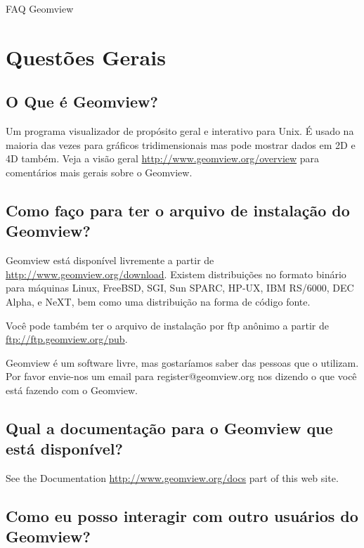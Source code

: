 \documentclass[12pt,a4paper]{article}
\begin{document}
\vspace*{6cm}
\huge
\begin{center}
FAQ
Geomview
\end{center}
\normalsize
\newpage
\tableofcontents
\newpage

\section{Quest\~oes Gerais}

    \subsection{O Que \'e Geomview?}

        Um programa visualizador de prop\'{o}sito geral e interativo para Unix. \'E usado
        na maioria das vezes para gr\'aficos tridimensionais mas pode mostrar dados em 2D e 4D tamb\'em. Veja
        a vis\~ao geral  \url{http://www.geomview.org/overview} para coment\'arios mais
        gerais sobre o Geomview.

    \subsection{Como fa\c{c}o para ter o arquivo de instala\c{c}\~ao do Geomview?}

        Geomview est\'a dispon\'ivel livremente a partir de  \url{http://www.geomview.org/download}.
        Existem distribui\c{c}\~oes no formato bin\'ario para m\'aquinas Linux, FreeBSD, SGI, Sun SPARC,
        HP-UX, IBM RS/6000, DEC Alpha, e NeXT, bem como uma distribui\c{c}\~ao na forma de
        c\'{o}digo fonte.

        Voc\^e pode tamb\'em ter o arquivo de instala\c{c}\~ao por ftp an\^onimo a partir de \url{ftp://ftp.geomview.org/pub}.

        Geomview \'e um software livre, mas gostar\'iamos saber das pessoas que o utilizam.
        Por favor envie-nos um email para register@geomview.org nos dizendo o que
        voc\^e est\'a fazendo com o Geomview.

    \subsection{Qual a documenta\c{c}\~ao para o Geomview que est\'a dispon\'ivel?}

        See the Documentation \url{http://www.geomview.org/docs} part of this web site.

    \subsection{Como eu posso interagir com outro usu\'arios do Geomview?}
\end{document}
